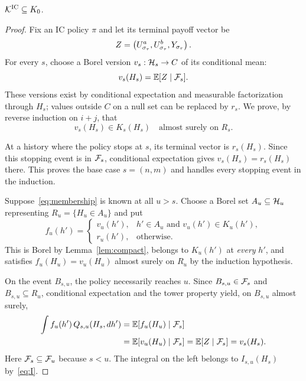 \documentclass[11pt]{extarticle}
\begin{document}
\begin{proposition}\label{prop:upper}
$\mathcal{K}^{\mathrm{IC}}\subseteq K_0$.
\end{proposition}
\begin{proof}
Fix an IC policy $\pi$ and let its terminal payoff vector be
\[
    Z=\left(U^a_{\sigma_\tau},U^b_{\sigma_\tau},Y_{\sigma_\tau}\right).
\]
For every $s$, choose a Borel version $v_s:\mathcal{H}_s\to C$ of its
conditional mean:
\begin{equation}
    v_s(H_s)=\mathbb{E}[Z\mid\mathcal{F}_s].
    \label{eq:v}
\end{equation}
These versions exist by conditional expectation and measurable
factorization through $H_s$; values outside $C$ on a null set can be
replaced by $r_s$. We prove, by reverse induction on $i+j$, that
\begin{equation}
    v_s(H_s)\in K_s(H_s)\quad\text{almost surely on }R_s.
    \label{eq:membership}
\end{equation}

At a history where the policy stops at $s$, its terminal vector is
$r_s(H_s)$. Since this stopping event is in $\mathcal{F}_s$, conditional
expectation gives $v_s(H_s)=r_s(H_s)$ there. This proves the base case
$s=(n,m)$ and handles every stopping event in the induction.

Suppose~\eqref{eq:membership} is known at all $u>s$. Choose a Borel
set $A_u\subseteq\mathcal{H}_u$ representing $R_u=\{H_u\in A_u\}$ and put
\[
    f_u(h')=
    \begin{cases}
       v_u(h'),&h'\in A_u\text{ and }v_u(h')\in K_u(h'),\\
       r_u(h'),&\text{otherwise}.
    \end{cases}
\]
This is Borel by Lemma~\ref{lem:compact}, belongs to $K_u(h')$ at
\emph{every} $h'$, and satisfies
$f_u(H_u)=v_u(H_u)$ almost surely on $R_u$ by the induction hypothesis.

On the event $B_{s,u}$, the policy necessarily reaches $u$. Since
$B_{s,u}\in\mathcal{F}_s$ and $B_{s,u}\subseteq R_u$, conditional expectation
and the tower property yield, on $B_{s,u}$ almost surely,
\begin{align}
    \int f_u(h')\,Q_{s,u}(H_s,dh')
    &=\mathbb{E}[f_u(H_u)\mid\mathcal{F}_s]\notag\\
    &=\mathbb{E}[v_u(H_u)\mid\mathcal{F}_s]
      =\mathbb{E}[Z\mid\mathcal{F}_s]=v_s(H_s).
    \label{eq:tower}
\end{align}
Here $\mathcal{F}_s\subseteq\mathcal{F}_u$ because $s<u$. The integral on the
left belongs to $I_{s,u}(H_s)$ by~\eqref{eq:I}.


\end{proof}
\end{document}
